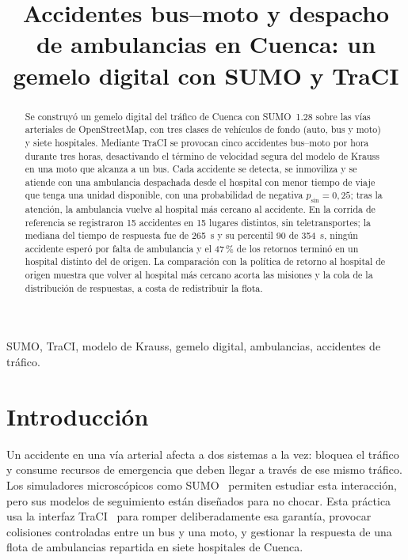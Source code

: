 \documentclass[conference,a4paper]{IEEEtran}
\begin{document}
\title{Accidentes bus--moto y despacho de ambulancias en Cuenca: un gemelo digital con SUMO y TraCI}

\author{
\and
{}
}

\maketitle

\begin{abstract}
Se construyó un gemelo digital del tráfico de Cuenca con SUMO~1.28 sobre las vías
arteriales de OpenStreetMap, con tres clases de vehículos de fondo (auto, bus y moto) y
siete hospitales. Mediante TraCI se provocan cinco accidentes bus--moto por hora durante
tres horas, desactivando el término de velocidad segura del modelo de Krauss en una moto
que alcanza a un bus. Cada accidente se detecta, se inmoviliza y se atiende con una
ambulancia despachada desde el hospital con menor tiempo de viaje que tenga una unidad
disponible, con una probabilidad de negativa $p_{\mathrm{sin}}=0{,}25$; tras la atención,
la ambulancia vuelve al hospital más cercano al accidente. En la corrida de referencia se
registraron 15 accidentes en 15 lugares distintos, sin teletransportes; la mediana del
tiempo de respuesta fue de 265~s y su percentil 90 de 354~s, ningún accidente esperó por
falta de ambulancia y el 47\,\% de los retornos terminó en un hospital distinto del de
origen. La comparación con la política de retorno al hospital de origen muestra que
volver al hospital más cercano acorta las misiones y la cola de la distribución de
respuestas, a costa de redistribuir la flota.
\end{abstract}

\begin{IEEEkeywords}
SUMO, TraCI, modelo de Krauss, gemelo digital, ambulancias, accidentes de tráfico.
\end{IEEEkeywords}

\section{Introducción}
Un accidente en una vía arterial afecta a dos sistemas a la vez: bloquea el tráfico y
consume recursos de emergencia que deben llegar a través de ese mismo tráfico. Los
simuladores microscópicos como SUMO~\cite{sumo} permiten estudiar esta interacción, pero
sus modelos de seguimiento están diseñados para no chocar. Esta práctica usa la interfaz
TraCI~\cite{traci} para romper deliberadamente esa garantía, provocar colisiones
controladas entre un bus y una moto, y gestionar la respuesta de una flota de ambulancias
repartida en siete hospitales de Cuenca.
\end{document}
